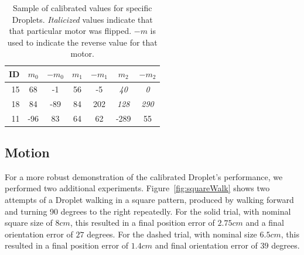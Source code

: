 \documentclass[letterpaper, 10pt, conference]{ieeeconf}
\begin{document}
\begin{table}[!htb]
\centering
\begin{tabular}{r|c|c|c|c|c|c}
 ID & $m_0$ & $-m_0$ & $m_1$ & $-m_1$ & $m_2$ & $-m_2$ \\
\hline
15 & 68 & -1 & 56 & -5 & \emph{40} & \emph{0}\\ 
18 & 84 & -89 & 84 & 202 & \emph{128}  & \emph{290}\\
11 & -96 & 83 & 64 & 62 & -289 & 55 \\
\end{tabular}
\caption{Sample of calibrated values for specific Droplets. \emph{Italicized} values indicate that that particular motor was flipped. $-m$ is used to indicate the reverse value for that motor.}
\label{DropletValueTable}
\end{table}

\subsection{Motion}
For a more robust demonstration of the calibrated Droplet's performance, we performed two additional experiments. Figure~\ref{fig:squareWalk} shows two attempts of a Droplet walking in a square pattern, produced by walking forward and turning 90 degrees to the right repeatedly. For the solid trial, with nominal square size of $8cm$, this resulted in a final position error of $2.75cm$ and a final orientation error of $27$ degrees. For the dashed trial, with nominal size $6.5cm$, this resulted in a final position error of $1.4cm$ and final orientation error of $39$ degrees.
\end{document}
